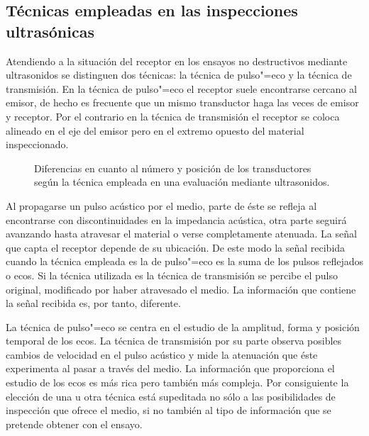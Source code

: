 \subsection{Técnicas empleadas en las inspecciones ultrasónicas}\label{subsec:technics}

Atendiendo a la situación del receptor en los ensayos no destructivos mediante ultrasonidos se distinguen dos técnicas: la técnica de pulso"=eco y la técnica de transmisión. En la técnica de pulso"=eco el receptor suele encontrarse cercano al emisor, de hecho es frecuente que un mismo transductor haga las veces de emisor y receptor. Por el contrario en la técnica de transmisión el receptor se coloca alineado en el eje del emisor pero en el extremo opuesto del material inspeccionado.\par

\begin{figure}
	\begin{center}
			\vspace*{.1\textheight}
	\end{center}
	\caption[Técnicas empleadas en ensayos no destructivos mediante ultrasonidos]{Diferencias en cuanto al número y posición de los transductores según la técnica empleada en una evaluación mediante ultrasonidos.}
	\label{fig:technics}
\end{figure}

Al propagarse un pulso acústico por el medio, parte de éste se refleja al encontrarse con discontinuidades en la impedancia acústica, otra parte seguirá avanzando hasta atravesar el material o verse completamente atenuada. La señal que capta el receptor depende de su ubicación. De este modo la señal recibida cuando la técnica empleada es la de pulso"=eco es la suma de los pulsos reflejados o ecos. Si la técnica utilizada es la técnica de transmisión se percibe el pulso original, modificado por haber atravesado el medio. La información que contiene la señal recibida es, por tanto, diferente.\par
La técnica de pulso"=eco se centra en el estudio de la amplitud, forma y posición temporal de los ecos. La técnica de transmisión por su parte observa posibles cambios de velocidad en el pulso acústico y mide la atenuación que éste experimenta al pasar a través del medio. La información que proporciona el estudio de los ecos es más rica pero también más compleja. Por consiguiente la elección de una u otra técnica está supeditada no sólo a las posibilidades de inspección que ofrece el medio, si no también al tipo de información que se pretende obtener con el ensayo.


